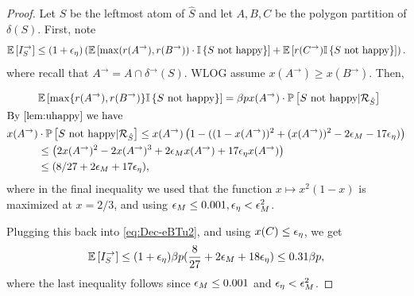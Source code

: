 \begin{proof}
Let $S$  be the leftmost atom of $\hat{S}$
and let $A,B,C$ be the polygon partition of $\delta(S)$. First, note 
\begin{equation}
\label{eq:Dec-eBTu2}
{\mathbb{E}}\left[I_S^\rightarrow\right] \le  (1+{\epsilon}_\eta) \left( {\mathbb{E}}\left[\max(r(A^\rightarrow), r(B^\rightarrow) ) \cdot {\mathbb{I}}\left\{S\text{ not  happy}\right\}\right] + {\mathbb{E}}\left[ r(C^\rightarrow){\mathbb{I}}\left\{S\text{ not  happy}\right\} \right]
\right).
\end{equation}
where recall that $A^\rightarrow=A\cap \delta^\rightarrow(S)$. 
WLOG assume $x(A^\rightarrow)\geq x(B^\rightarrow)$. Then, 

\begin{align*}
&\E{\max\{r(A^\rightarrow), r(B^\rightarrow)\}\I{S\text{ not happy}}} = 	
  \beta p x(A^\rightarrow) \cdot \P{S\text{ not happy} |\cR_{\hat{S}}}\\
 \intertext{By \cref{lem:uhappy} we have}
  x(A^\rightarrow) & \cdot \P{S\text{ not happy} |\cR_{\hat{S}}}
 	 \le x(A^\rightarrow)   \left(1-((1- x(A^\rightarrow))^2 + (x(A^\rightarrow))^2 -2\eps_M 
	- 17\eps_\eta)\right)  \\
	&\leq \left(2x(A^\rightarrow)^2-2x(A^\rightarrow)^3 +2\eps_M x(A^\rightarrow)+17\eps_\eta x(A^\rightarrow)\right)\\
	&\leq (8/27+2\eps_M+17\eps_\eta),
\end{align*}
where in the final inequality we used that the function $x\mapsto x^2(1-x)$ is maximized at $x=2/3$, and using ${\epsilon}_M\leq 0.00 1,{\epsilon}_\eta<{\epsilon}_M^2$.

Plugging this back into \eqref{eq:Dec-eBTu2}, and using $x(C) \le 
{\epsilon}_\eta$, we get
 $${\mathbb{E}}\left[I_{S}^\rightarrow\right] \le  (1+ {\epsilon}_\eta)\beta p(\frac{8}{27}+2{\epsilon}_M+18{\epsilon}_\eta)\leq 0.31 \beta p, $$
 where the last inequality follows since ${\epsilon}_M\leq 0.001$ and ${\epsilon}_\eta <{\epsilon}_M^2$. 
\end{proof}

